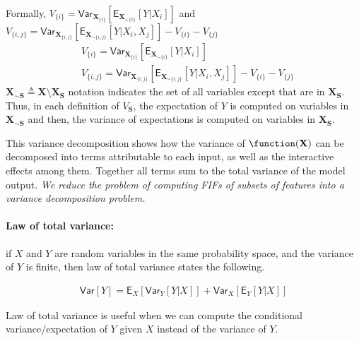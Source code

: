 Formally, $V_{\{i\}} = \mathsf{Var}_{\mathbf{X}_{\{i\}}}[\mathsf{E}_{\mathbf{X}_{\sim \{i\}}}[Y | X_i]]$ and $V_{\{i,j\}} = \mathsf{Var}_{\mathbf{X}_{\{i,j\}}}[\mathsf{E}_{\mathbf{X}_{\sim \{i,j\}}}[Y | X_i, X_j]] - V_{\{i\}} - V_{\{j\}}$
\begin{align*}
	& V_{\{i\}} = \mathsf{Var}_{\mathbf{X}_{\{i\}}}[\mathsf{E}_{\mathbf{X}_{\sim \{i\}}}[Y | X_i]]\\
	& V_{\{i,j\}} = \mathsf{Var}_{\mathbf{X}_{\{i,j\}}}[\mathsf{E}_{\mathbf{X}_{\sim \{i,j\}}}[Y | X_i, X_j]] - V_{\{i\}} - V_{\{j\}}%
\end{align*}
$ \mathbf{X}_{\sim \mathbf{S}} \triangleq \mathbf{X} \setminus \mathbf{X}_{\mathbf{S}} $ notation indicates the set of all variables except that are in  $ \mathbf{X}_{\mathbf{S}} $. Thus, in each definition of $ V_{\mathbf{S}} $, the expectation of $ Y $ is computed on variables in $ \mathbf{X}_{\sim \mathbf{S}} $ and then, the variance of expectations is computed on variables in $ \mathbf{X}_{\mathbf{S}} $. 


This variance decomposition shows how the variance of $\function(\mathbf{X}) $ can be decomposed into terms attributable to each input, as well as the interactive effects among them. Together all terms sum to the total variance of the model output. 
\textit{We reduce the problem of computing FIFs of subsets of features into a variance decomposition problem.}


\paragraph{Law of total variance:}

if $ X $ and $ Y $ are random variables in the same probability space, and the variance of $ Y $ is finite, then law of total variance states the following.

\begin{align*}
	\mathsf{Var}[Y] = \mathsf{E}_X[\mathsf{Var}_Y[Y|X]] + \mathsf{Var}_X[\mathsf{E}_Y[Y|X]]
\end{align*}


Law of total variance is useful when we can compute the conditional variance/expectation of $ Y $ given $ X $ instead of the variance of $ Y $. 
\fi



